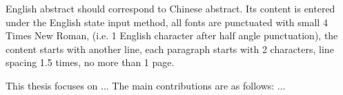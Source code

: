 \begin{enabstract}
    English abstract should correspond to Chinese abstract. Its content is entered under the English state input method, all fonts are punctuated with small 4 Times New Roman, (i.e. 1 English character after half angle punctuation), the content starts with another line, each paragraph starts with 2 characters, line spacing 1.5 times, no more than 1 page.

    This thesis focuses on ... The main contributions are as follows: ...

\end{enabstract}